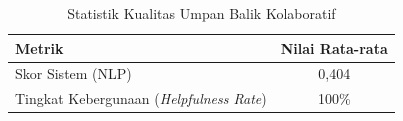 \begin{table}[!ht]
    \centering
    \caption{Statistik Kualitas Umpan Balik Kolaboratif}
    \label{tbl:social_quality}
    \begin{tabular}{|l|c|}
        \hline
        \textbf{Metrik} & \textbf{Nilai Rata-rata} \\
        \hline
        Skor Sistem (NLP) & 0,404 \\
        \hline
        Tingkat Kebergunaan (\textit{Helpfulness Rate}) & 100\% \\
        \hline
    \end{tabular}
\end{table}